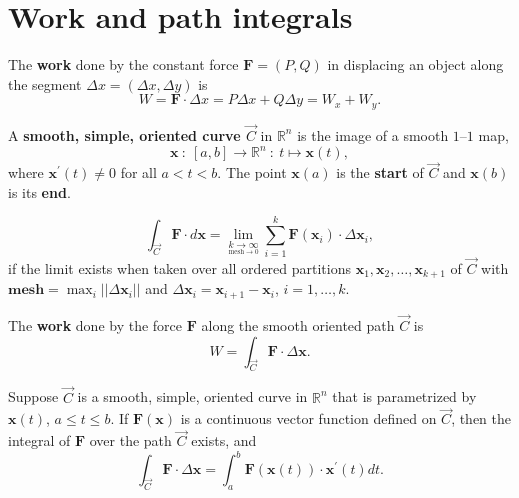 \section{Work and path integrals}
\begin{definition}
	\label{definition-1.1}
	The \textbf{work} done by the constant force $\textbf{F}=\left(P,Q\right)$ in displacing an object along the segment $\Delta x=\left(\Delta x,\Delta y\right)$ is
	\begin{equation*}
	W=\textbf{F}\cdot\Delta x=P\Delta x+Q\Delta y=W_x+W_y.
	\end{equation*}
\end{definition}

\begin{definition}
	\label{definition-1.2}
	A \textbf{smooth, simple, oriented curve $\overrightarrow{C}$} in $\mathbb{R}^n$ is the image of a smooth $1$--$1$ map,
	\begin{equation*}
	\textbf{x}~:~\left[a,b\right]\to\mathbb{R}^n~:~t\mapsto\textbf{x}\left(t\right),
	\end{equation*}
	where $\textbf{x}^\prime\left(t\right)\neq0$ for all $a<t<b$. The point $\textbf{x}\left(a\right)$ is the \textbf{start} of $\overrightarrow{C}$ and $\textbf{x}\left(b\right)$ is its \textbf{end}.
\end{definition}

\begin{definition}
	\label{definition-1.3}
	\begin{equation*}
	\int_{\overrightarrow{C}}\textbf{F}\cdot d\textbf{x}=\lim\limits_{\underset{\text{mesh}\to 0}{k\to\infty}} \sum_{i=1}^{k} \textbf{F}\left(\textbf{x}_i\right)\cdot\Delta\textbf{x}_i,
	\end{equation*}
	if the limit exists when taken over all ordered partitions $\textbf{x}_1,\textbf{x}_2,\ldots,\textbf{x}_{k+1}$ of $\overrightarrow{C}$ with $\textbf{mesh}=\max_i \left|\left|\Delta\textbf{x}_i\right|\right|$ and $\Delta\textbf{x}_i=\textbf{x}_{i+1}-\textbf{x}_i$, $i=1,\ldots,k$.
\end{definition}

\begin{definition}
	\label{definition-1.4}
	The \textbf{work} done by the force $\textbf{F}$ along the smooth oriented path $\overrightarrow{C}$ is
	\begin{equation}
	W=\int_{\overrightarrow{C}}\textbf{F}\cdot\Delta\textbf{x}.
	\end{equation}
\end{definition}

\begin{theorem}
	\label{theorem-1.1}
	Suppose $\overrightarrow{C}$ is a smooth, simple, oriented curve in $\mathbb{R}^n$ that is parametrized by $\textbf{x}\left(t\right)$, $a\leq t\leq b$. If $\textbf{F}\left(\textbf{x}\right)$ is a continuous vector function defined on $\overrightarrow{C}$, then the integral of $\textbf{F}$ over the path $\overrightarrow{C}$ exists, and
	\begin{equation}
	\int_{\overrightarrow{C}}\textbf{F}\cdot\Delta\textbf{x}=\int_a^b\textbf{F}\left(\textbf{x}\left(t\right)\right)\cdot\textbf{x}^\prime\left(t\right) dt.
	\end{equation}
\end{theorem}
